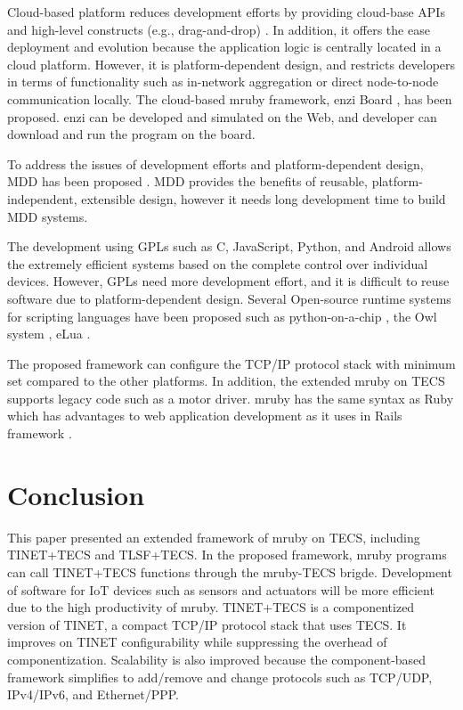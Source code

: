 \documentclass[a4j,12pt,oneside,openany,english]{jsbook}
\begin{document}
Cloud-based platform reduces development efforts by providing cloud-base APIs and high-level constructs (e.g., drag-and-drop) \cite{par:cloud-based}.
In addition, it offers the ease deployment and evolution because the application logic is centrally located in a cloud platform.
However, it is platform-dependent design, and restricts developers in terms of functionality such as in-network aggregation or direct node-to-node communication locally.
The cloud-based mruby framework, enzi Board \cite{url:enzi}, has been proposed.
enzi can be developed and simulated on the Web, and developer can download and run the program on the board.

To address the issues of development efforts and platform-dependent design, MDD has been proposed \cite{par:MDD}.
MDD provides the benefits of reusable, platform-independent, extensible design, however it needs long development time to build MDD systems.

The development using GPLs such as C, JavaScript, Python, and Android allows the extremely efficient systems based on the complete control over individual devices.
However, GPLs need more development effort, and it is difficult to reuse software due to platform-dependent design.
Several Open-source runtime systems for scripting languages have been proposed such as python-on-a-chip \cite{url:python-on-a-chip}, the Owl system \cite{par:owl}, eLua \cite{url:eLua}.

The proposed framework can configure the TCP/IP protocol stack with minimum set compared to the other platforms.
In addition, the extended mruby on TECS supports legacy code such as a motor driver.
mruby has the same syntax as Ruby which has advantages to web application development as it uses in Rails framework \cite{url:rubyonrails}.



\chapter{Conclusion}
\label{sec:Conclusion}

This paper presented an extended framework of mruby on TECS, including TINET+TECS and TLSF+TECS.
In the proposed framework, mruby programs can call TINET+TECS functions through the mruby-TECS brigde.
Development of software for IoT devices such as sensors and actuators will be more efficient due to the high productivity of mruby.
TINET+TECS is a componentized version of TINET, a compact TCP/IP protocol stack that uses TECS.
It improves on TINET configurability while suppressing the overhead of componentization.
Scalability is also improved because the component-based framework simplifies to add/remove and change protocols such as TCP/UDP, IPv4/IPv6, and Ethernet/PPP.
\end{document}
